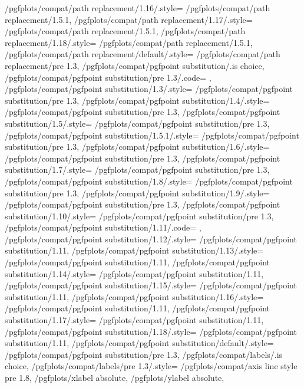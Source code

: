 {	/pgfplots/compat/path replacement/1.16/.style=   	{/pgfplots/compat/path replacement/1.5.1},
	/pgfplots/compat/path replacement/1.17/.style=   	{/pgfplots/compat/path replacement/1.5.1},
	/pgfplots/compat/path replacement/1.18/.style=   	{/pgfplots/compat/path replacement/1.5.1},
	/pgfplots/compat/path replacement/default/.style=	{/pgfplots/compat/path replacement/pre 1.3},%
	/pgfplots/compat/pgfpoint substitution/.is choice,
	/pgfplots/compat/pgfpoint substitution/pre 1.3/.code= {\pgfplots@substitute@pgfpointfalse},
	/pgfplots/compat/pgfpoint substitution/1.3/.style=    {/pgfplots/compat/pgfpoint substitution/pre 1.3},%
	/pgfplots/compat/pgfpoint substitution/1.4/.style=  	 {/pgfplots/compat/pgfpoint substitution/pre 1.3},
	/pgfplots/compat/pgfpoint substitution/1.5/.style=    {/pgfplots/compat/pgfpoint substitution/pre 1.3},%
	/pgfplots/compat/pgfpoint substitution/1.5.1/.style=	{/pgfplots/compat/pgfpoint substitution/pre 1.3},%
	/pgfplots/compat/pgfpoint substitution/1.6/.style=   	{/pgfplots/compat/pgfpoint substitution/pre 1.3},
	/pgfplots/compat/pgfpoint substitution/1.7/.style=   	{/pgfplots/compat/pgfpoint substitution/pre 1.3},
	/pgfplots/compat/pgfpoint substitution/1.8/.style=   	{/pgfplots/compat/pgfpoint substitution/pre 1.3},
	/pgfplots/compat/pgfpoint substitution/1.9/.style=   	{/pgfplots/compat/pgfpoint substitution/pre 1.3},
	/pgfplots/compat/pgfpoint substitution/1.10/.style=   	{/pgfplots/compat/pgfpoint substitution/pre 1.3},
	/pgfplots/compat/pgfpoint substitution/1.11/.code=   	{\pgfplots@substitute@pgfpointtrue},
	/pgfplots/compat/pgfpoint substitution/1.12/.style=   	{/pgfplots/compat/pgfpoint substitution/1.11},
	/pgfplots/compat/pgfpoint substitution/1.13/.style=   	{/pgfplots/compat/pgfpoint substitution/1.11},
	/pgfplots/compat/pgfpoint substitution/1.14/.style=   	{/pgfplots/compat/pgfpoint substitution/1.11},
	/pgfplots/compat/pgfpoint substitution/1.15/.style=   	{/pgfplots/compat/pgfpoint substitution/1.11},
	/pgfplots/compat/pgfpoint substitution/1.16/.style=   	{/pgfplots/compat/pgfpoint substitution/1.11},
	/pgfplots/compat/pgfpoint substitution/1.17/.style=   	{/pgfplots/compat/pgfpoint substitution/1.11},
	/pgfplots/compat/pgfpoint substitution/1.18/.style=   	{/pgfplots/compat/pgfpoint substitution/1.11},
	/pgfplots/compat/pgfpoint substitution/default/.style=	{/pgfplots/compat/pgfpoint substitution/pre 1.3},%
	/pgfplots/compat/labels/.is choice,
	/pgfplots/compat/labels/pre 1.3/.style={%
		/pgfplots/compat/axis line style pre 1.8,
		/pgfplots/xlabel absolute,
		/pgfplots/ylabel absolute},%
}
